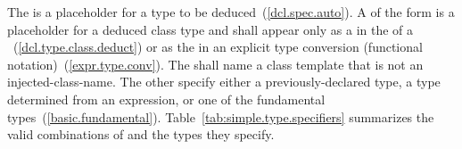 \pnum
{}%
%
%
%
%
%
%
%
%
%
%
%
%
%
%
%
%
The   is a placeholder for a type to be
deduced~(\ref{dcl.spec.auto}).
%
A  of the form
\opt{} \opt{} 
is a placeholder for a deduced class type
and shall appear only as a 
in the 
of a ~(\ref{dcl.type.class.deduct})
or as the 
in an explicit type conversion (functional notation)~(\ref{expr.type.conv}).
The  shall name a class template
that is not an injected-class-name.
The other
specify either a previously-declared type, a type determined from an
expression, or one of the
fundamental types~(\ref{basic.fundamental}).
Table~\ref{tab:simple.type.specifiers}
 summarizes the valid combinations of
and the types they specify.

